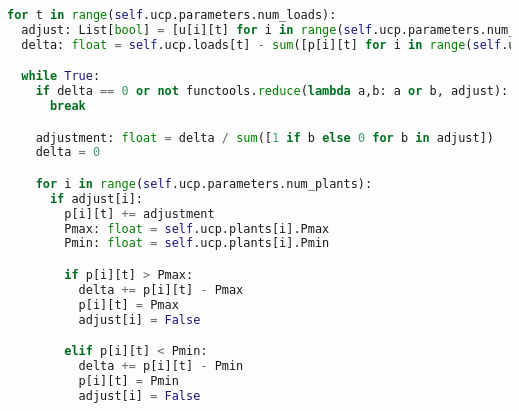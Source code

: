 \begin{lstlisting}[caption={Adjusting the UCP Solution}, language=Python]
for t in range(self.ucp.parameters.num_loads):
  adjust: List[bool] = [u[i][t] for i in range(self.ucp.parameters.num_plants)]
  delta: float = self.ucp.loads[t] - sum([p[i][t] for i in range(self.ucp.parameters.num_plants)])

  while True:
    if delta == 0 or not functools.reduce(lambda a,b: a or b, adjust):
      break

    adjustment: float = delta / sum([1 if b else 0 for b in adjust])
    delta = 0

    for i in range(self.ucp.parameters.num_plants):
      if adjust[i]:
        p[i][t] += adjustment
        Pmax: float = self.ucp.plants[i].Pmax
        Pmin: float = self.ucp.plants[i].Pmin

        if p[i][t] > Pmax:
          delta += p[i][t] - Pmax
          p[i][t] = Pmax
          adjust[i] = False

        elif p[i][t] < Pmin:
          delta += p[i][t] - Pmin
          p[i][t] = Pmin
          adjust[i] = False
\end{lstlisting}
